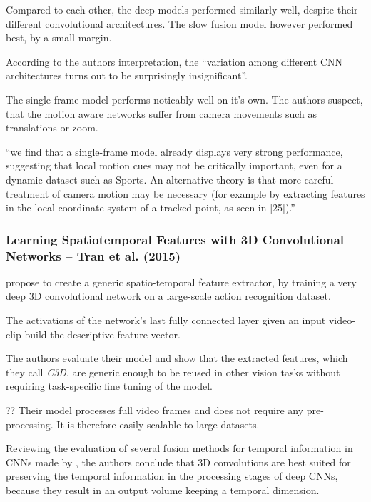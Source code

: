 Compared to each other, the deep models performed similarly well, despite their different convolutional architectures. The slow fusion model however performed best, by a small margin.

According to the authors interpretation, the ``variation among different CNN architectures turns out to be surprisingly insignificant''\cite{karpathy_large-scale_2014}.

The single-frame model performs noticably well on it's own. The authors suspect, that the motion aware networks suffer from camera movements such as translations or zoom.

``we find that a single-frame model already displays very strong performance, suggesting that local motion cues may not be critically important, even for a dynamic dataset such as Sports. An alternative theory is that more careful treatment of camera motion may be necessary (for example by extracting features in the local coordinate system of a tracked point, as seen in [25]).''


\subsubsection{Learning Spatiotemporal Features with 3D Convolutional Networks -- Tran et al. (2015)}

\textcite{tran_learning_2015} propose to create a generic spatio-temporal feature extractor, by training a very deep 3D convolutional network on a large-scale action recognition dataset.

The activations of the network's last fully connected layer given an input video-clip build the descriptive feature-vector.

The authors evaluate their model and show that the extracted features, which they call \textit{C3D}, are generic enough to be reused in other vision tasks without requiring task-specific fine tuning of the model. 

?? Their model processes full video frames and does not require any pre-processing. It is therefore easily scalable to large datasets.

Reviewing the evaluation of several fusion methods for temporal information in CNNs made by \textcite{karpathy_large-scale_2014}, the authors conclude that 3D convolutions are best suited for preserving the temporal information in the processing stages of deep CNNs, because they result in an output volume keeping a temporal dimension.

